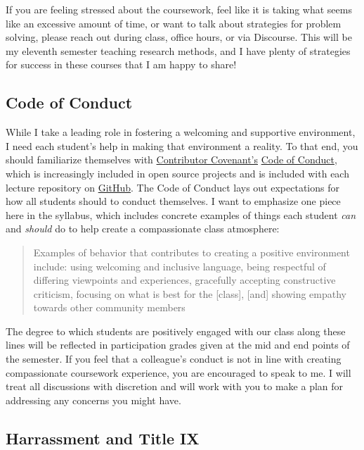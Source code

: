 \documentclass[
]{book}
\begin{document}
If you are feeling stressed about the coursework, feel like it is taking what seems like an excessive amount of time, or want to talk about strategies for problem solving, please reach out during class, office hours, or via Discourse. This will be my eleventh semester teaching research methods, and I have plenty of strategies for success in these courses that I am happy to share!

\hypertarget{code-of-conduct}{%
\subsection{Code of Conduct}\label{code-of-conduct}}

While I take a leading role in fostering a welcoming and supportive environment, I need each student's help in making that environment a reality. To that end, you should familiarize themselves with \href{https://www.contributor-covenant.org}{Contributor Covenant's} \href{https://www.contributor-covenant.org/version/1/4/code-of-conduct}{Code of Conduct}, which is increasingly included in open source projects and is included with each lecture repository on \href{https://github.com/slu-soc5650}{GitHub}. The Code of Conduct lays out expectations for how all students should to conduct themselves. I want to emphasize one piece here in the syllabus, which includes concrete examples of things each student \emph{can} and \emph{should} do to help create a compassionate class atmosphere:

\begin{quote}
Examples of behavior that contributes to creating a positive environment include: using welcoming and inclusive language, being respectful of differing viewpoints and experiences, gracefully accepting constructive criticism, focusing on what is best for the {[}class{]}, {[}and{]} showing empathy towards other community members
\end{quote}

The degree to which students are positively engaged with our class along these lines will be reflected in participation grades given at the mid and end points of the semester. If you feel that a colleague's conduct is not in line with creating compassionate coursework experience, you are encouraged to speak to me. I will treat all discussions with discretion and will work with you to make a plan for addressing any concerns you might have.

\hypertarget{harrassment-and-title-ix}{%
\subsection{Harrassment and Title IX}\label{harrassment-and-title-ix}}
\end{document}
